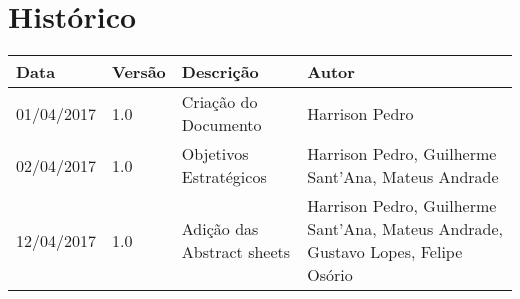 \chapter{Histórico}

\begin{tabular}{ |p{3cm}|p{3cm}|p{3cm}|p{3cm}|  }
 \hline
 Data 		& 		Versão & 		Descrição 			& 		Autor\\
 \hline\hline
 01/04/2017 & 		1.0    &		Criação do Documento &   	Harrison Pedro \\ 
 \hline
 02/04/2017 & 		1.0    &		Objetivos Estratégicos &   	Harrison Pedro, Guilherme Sant'Ana, Mateus Andrade \\ 
 \hline
 12/04/2017 & 		1.0    &		Adição das Abstract sheets  &   	Harrison Pedro, Guilherme Sant'Ana, Mateus Andrade, Gustavo Lopes, Felipe Osório \\ 
 \hline

\end{tabular}

